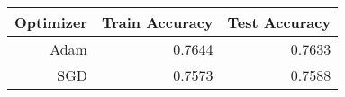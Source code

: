 \begin{tabular}{|r||r|r|}
\hline
Optimizer & Train Accuracy & Test Accuracy \\
\hline
Adam & 0.7644 & 0.7633 \\
SGD & 0.7573 & 0.7588 \\
\hline
\end{tabular}

